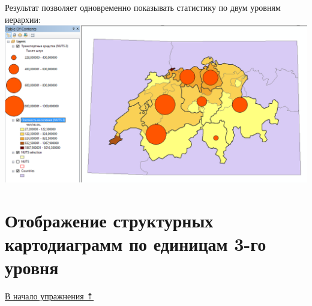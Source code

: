 \documentclass[12pt,]{book}
\begin{document}
Результат позволяет одновременно показывать статистику по двум уровням иерархии:
\includegraphics{images/Ex08/image27.png}

\hypertarget{stat-map-economic-diagrams3}{%
\section{Отображение структурных картодиаграмм по единицам 3-го уровня}\label{stat-map-economic-diagrams3}}

\protect\hyperlink{stat-map-economic}{В начало упражнения ⇡}
\end{document}
